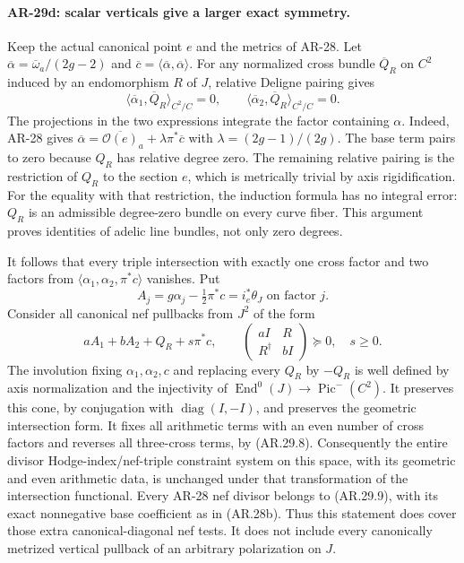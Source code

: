 \paragraph{AR-29d: scalar verticals give a larger exact symmetry.}
Keep the actual canonical point $e$ and the metrics of AR-28.
Let $\overline\alpha=\overline\omega_a/(2g-2)$ and
$\overline c=\langle\overline\alpha,\overline\alpha\rangle$.
For any normalized cross bundle $\overline Q_R$ on $C^2$ induced
by an endomorphism $R$ of $J$, relative Deligne pairing gives
\[
 \langle\overline\alpha_1,\overline Q_R\rangle_{C^2/C}=0,
 \qquad
 \langle\overline\alpha_2,\overline Q_R\rangle_{C^2/C}=0.       \tag{AR.29.8}
\]
The projections in the two expressions integrate the factor
containing $\alpha$.  Indeed, AR-28 gives
$\overline\alpha=\overline{\mathcal O(e)}_a+\lambda\pi^*\overline c$
with $\lambda=(2g-1)/(2g)$.  The base term pairs to zero because
$Q_R$ has relative degree zero.  The remaining relative pairing
is the restriction of $Q_R$ to the section $e$, which is
metrically trivial by axis rigidification.  For the equality with
that restriction, the induction formula has no integral error:
$Q_R$ is an admissible degree-zero bundle on every curve fiber.
This argument proves identities of adelic line bundles, not only
zero degrees.

It follows that every triple intersection with exactly one cross
factor and two factors from
$\langle\alpha_1,\alpha_2,\pi^*c\rangle$ vanishes.  Put
\[
 A_j=g\alpha_j-\tfrac12\pi^*c=i_e^*\theta_J\text{ on factor }j.
\]
Consider all canonical nef pullbacks from $J^2$ of the form
\[
 a A_1+b A_2+Q_R+s\pi^*c,
 \qquad
 \begin{pmatrix}aI&R\\R^\dagger&bI\end{pmatrix}\succeq0,
 \quad s\ge0.                                             \tag{AR.29.9}
\]
The involution fixing $\alpha_1,\alpha_2,c$ and replacing every
$Q_R$ by $-Q_R$ is well defined by axis normalization and the
injectivity of $\operatorname{End}^0(J)\to\operatorname{Pic}^-(C^2)$.
It preserves this cone, by conjugation with $\operatorname{diag}(I,-I)$,
and preserves the geometric intersection form.  It fixes all
arithmetic terms with an even number of cross factors and reverses
all three-cross terms, by (AR.29.8).
Consequently the entire divisor Hodge-index/nef-triple constraint
system on this space, with its geometric and even arithmetic data,
is unchanged under that transformation of the intersection
functional.  Every AR-28 nef divisor belongs to (AR.29.9), with
its exact nonnegative base coefficient as in (AR.28b).  Thus this
statement does cover those extra canonical-diagonal nef tests.
It does not include every canonically metrized vertical pullback
of an arbitrary polarization on $J$.

